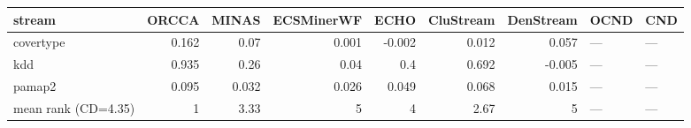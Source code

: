 \begin{tabular}{lrrrrrrll}
\hline
 stream              &   ORCCA &   MINAS &   ECSMinerWF &   ECHO &   CluStream &   DenStream & OCND   & CND   \\
\hline
 covertype           &   0.162 &   0.07  &        0.001 & -0.002 &       0.012 &       0.057 & ---    & ---   \\
 kdd                 &   0.935 &   0.26  &        0.04  &  0.4   &       0.692 &      -0.005 & ---    & ---   \\
 pamap2              &   0.095 &   0.032 &        0.026 &  0.049 &       0.068 &       0.015 & ---    & ---   \\
 mean rank (CD=4.35) &   1     &   3.33  &        5     &  4     &       2.67  &       5     & ---    & ---   \\
\hline
\end{tabular}